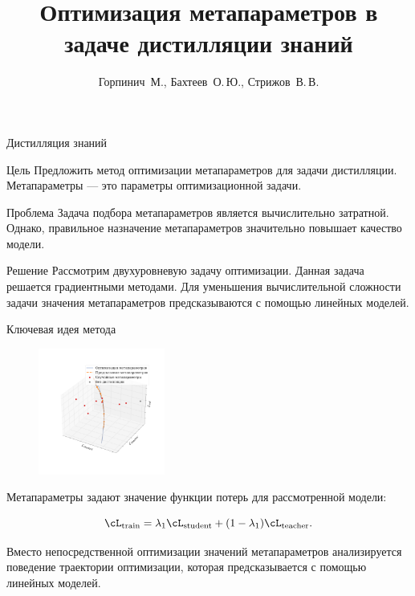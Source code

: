 \documentclass[12pt, aspectratio=169]{beamer}
\title[\hbox to 56mm{Оптимизация метапараметров в задаче дистилляции знаний}]{Оптимизация метапараметров в задаче дистилляции знаний}
\author[Горпинич~М., Бахтеев~О.\,Ю., Стрижов~В.\,В.]{Горпинич~М., Бахтеев~О.\,Ю., Стрижов~В.\,В.}
\institute{\fontsize{11}{14}\selectfont Московский физико-технический институт (государственный университет)}
\date{\footnotesize
\par\bigskip\small 2021}
\begin{document}
\begin{frame}
\thispagestyle{empty}
\maketitle
\end{frame}

\begin{frame}{Дистилляция знаний}
\begin{block}{Цель}
    Предложить метод оптимизации метапараметров для задачи дистилляции. Метапараметры --- это параметры оптимизационной задачи. 
    
\end{block}
\begin{block}{Проблема}
    Задача подбора метапараметров является вычислительно затратной. Однако, правильное назначение метапараметров значительно повышает качество модели.
\end{block}
\begin{block}{Решение}
    Рассмотрим двухуровневую задачу оптимизации. Данная задача решается градиентными методами. Для уменьшения вычислительной сложности задачи значения метапараметров предсказываются с помощью линейных моделей.
\end{block}
\end{frame}

\begin{frame}{Ключевая идея метода}
    \begin{figure}
    \caption*{}
    \vspace{-1.26 cm}
    \includegraphics[width=0.37\textwidth]{trajectory_rus__.pdf}
\end{figure}

\vspace{-0.25 cm}

\fontsize{11}{5}\selectfont
Метапараметры задают значение функции потерь для рассмотренной модели:

$$\cL_{\text{train}} = \lambda_1\cL_{\text{student}} + (1-\lambda_1)\cL_{\text{teacher}}.$$ 

Вместо непосредственной оптимизации значений метапараметров анализируется поведение траектории оптимизации, которая предсказывается с помощью линейных моделей.

\end{frame}
\end{document}
